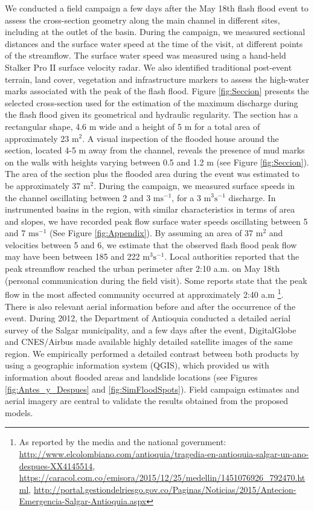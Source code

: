 \documentclass[hess, manuscript]{copernicus}
\begin{document}
We conducted a field campaign a few days after the May 18th flash flood event to assess the cross-section geometry along the main channel in different sites, including at the outlet of the basin. During the campaign, we measured sectional distances and the surface water speed at the time of the visit, at different points of the streamflow. The surface water speed was measured using a hand-held Stalker Pro II surface velocity radar. We also identified traditional post-event terrain, land cover, vegetation and infrastructure markers to assess the high-water marks associated with the peak of the flash flood.  Figure \ref{fig:Seccion} presents the selected cross-section used for the estimation of the maximum discharge during the flash flood given its geometrical and hydraulic regularity. The section has a rectangular shape, 4.6 $\text{m}$ wide and a height of 5 $\text{m}$ for a total area of approximately 23 $\text{m}^2$. A visual inspection of the flooded house around the section, located 4-5 $\text{m}$ away from the channel, reveals the presence of mud marks on the walls with heights varying between 0.5 and 1.2 $\text{m}$ (see Figure \ref{fig:Seccion}). The area of the section plus the flooded area during the event was estimated to be approximately 37 $\text{m}^2$.  During the campaign, we measured surface speeds in the channel oscillating between 2 and 3 $\text{ms}^{-1}$, for a  3 m$^3 \text{s}^{-1}$ discharge. In instrumented basins in the region, with similar characteristics in terms of area and slopes, we have recorded peak flow surface water speeds oscillating between 5 and 7 $\text{ms}^{-1}$ (See Figure \ref{fig:Appendix}). By assuming an area of 37 $\text{m}^2$ and velocities between 5 and 6,  we estimate that the observed flash flood peak flow may have been between 185 and 222 $\text{m}^3\text{s}^{-1}$. Local authorities reported that the peak streamflow reached the urban perimeter after 2:10 a.m. on May 18th (personal communication during the field visit). Some reports state that the peak flow in the most affected community occurred at approximately 2:40 a.m \footnote{As reported by the media and the national government: \url{http://www.elcolombiano.com/antioquia/tragedia-en-antioquia-salgar-un-ano-despues-XX4145514}, \url{https://caracol.com.co/emisora/2015/12/25/medellin/1451076926_792470.html}, \url{http://portal.gestiondelriesgo.gov.co/Paginas/Noticias/2015/Antecion-Emergencia-Salgar-Antioquia.aspx}}.\\

There is also relevant aerial information before and after the occurrence of the event.  During 2012, the Department of Antioquia conducted a detailed aerial survey of the Salgar municipality, and a few days after the event, DigitalGlobe and CNES/Airbus made available highly detailed satellite images of the same region. We empirically performed a detailed contrast between both products by using a geographic information system (QGIS), which provided us with information about flooded areas and landslide locations (see Figures \ref{fig:Antes_y_Despues} and \ref{fig:SimFloodSpots}). Field campaign estimates and aerial imagery are central to validate the results obtained from the proposed models.\\
\end{document}
